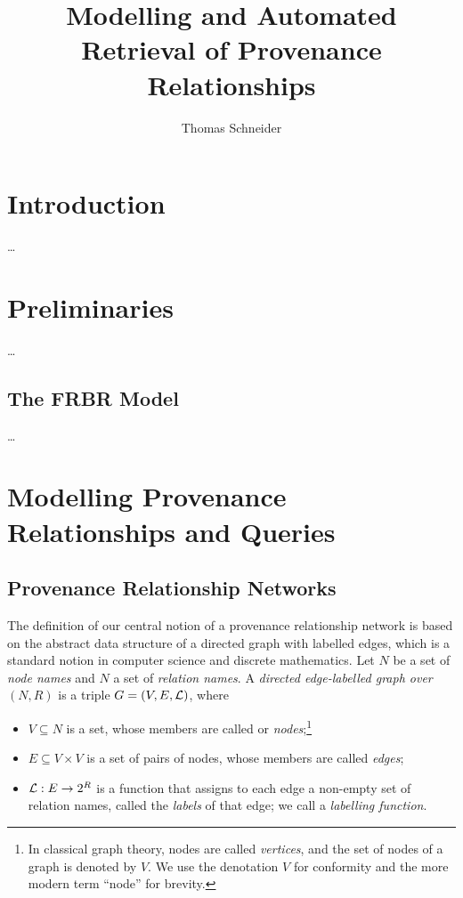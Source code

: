 \documentclass[11pt,DIV=11,a4paper,BCOR15mm,twoside=on]{scrreprt}
\title{Modelling and Automated Retrieval of Provenance Relationships}
\author{Thomas Schneider}
\begin{document}
  \maketitle
  
  \chapter{Introduction}
  
  \dots

  \chapter{Preliminaries}

  \dots

  \section{The FRBR Model}
  
  \dots

  \chapter{Modelling Provenance Relationships and Queries}
  
  
  \section{Provenance Relationship Networks}
  
  The definition of our central notion of a provenance relationship network
  is based on the abstract data structure of a directed graph with labelled edges,
  which is a standard notion in computer science and discrete mathematics.
  Let $N$ be a set of \emph{node names} and $N$ a set of \emph{relation names}.
  A \emph{directed edge-labelled graph over $(N,R)$} is a triple $G = (V,E,\mathcal{L})$,
  where
  \begin{itemize}
    \item
      $V \subseteq N$ is a set, whose members are called or \emph{nodes};\footnote{%
        In classical graph theory, nodes are called \emph{vertices}, and the set of
        nodes of a graph is denoted by $V$. We use the denotation $V$ for conformity
        and the more modern term ``node'' for brevity.%
      }      
    \item 
      $E \subseteq V \times V$ is a set of pairs of nodes, whose members are called \emph{edges};
    \item
      $\mathcal{L} : E \to 2^R$ is a function that assigns to each edge a non-empty set of relation names,
      called the \emph{labels} of that edge; we call \Lmc a \emph{labelling function}.
  \end{itemize}
  
\end{document}
